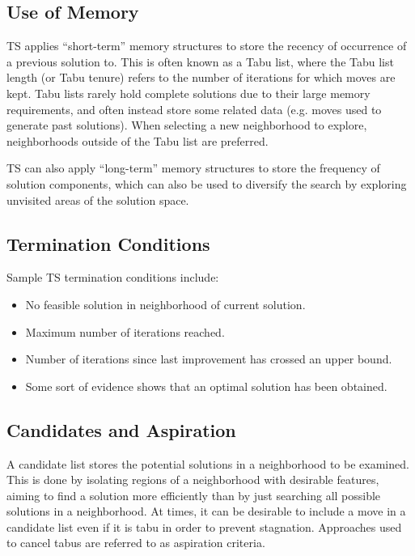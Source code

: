 \documentclass[12pt,titlepage]{article}
\begin{document}
    \subsection{Use of Memory}
      TS applies ``short-term'' memory structures to store the recency of occurrence of a previous solution to. This is often known as a Tabu list, where the Tabu list length
      (or Tabu tenure) refers to the number of iterations for which moves are kept. Tabu lists rarely hold complete solutions due to their large memory requirements, and often
      instead store some related data (e.g. moves used to generate past solutions). When selecting a new neighborhood to explore, neighborhoods outside of the Tabu list are preferred.

      TS can also apply ``long-term'' memory structures to store the frequency of solution components, which can also be used to diversify the search by exploring unvisited
      areas of the solution space.

    \subsection{Termination Conditions}
      Sample TS termination conditions include:
      \begin{itemize}
        \item No feasible solution in neighborhood of current solution.
        \item Maximum number of iterations reached.
        \item Number of iterations since last improvement has crossed an upper bound.
        \item Some sort of evidence shows that an optimal solution has been obtained.
      \end{itemize}

    \subsection{Candidates and Aspiration}
      A candidate list stores the potential solutions in a neighborhood to be examined. This is done by isolating regions of a neighborhood with desirable features, aiming
      to find a solution more efficiently than by just searching all possible solutions in a neighborhood. At times, it can be desirable to include a move in a candidate list
      even if it is tabu in order to prevent stagnation. Approaches used to cancel tabus are referred to as aspiration criteria. 
\end{document}
